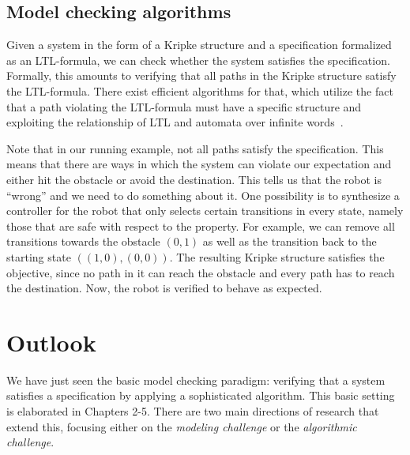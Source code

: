 \documentclass[11pt]{article}
\begin{document}
\subsection{Model checking algorithms}

Given a system in the form of a Kripke structure and a specification formalized as an LTL-formula, we can check whether the system satisfies the specification. 
Formally, this amounts to verifying that all paths in the Kripke structure satisfy the LTL-formula. There exist efficient algorithms for that, which utilize the fact that a path violating the LTL-formula must have a specific structure and exploiting the relationship of LTL and automata over infinite words~\cite[Theorem 2]{handbook}.

Note that in our running example, not all paths satisfy the specification. This means that there are ways in which the system can violate our expectation and either hit the obstacle or avoid the destination.
This tells us that the robot is ``wrong'' and we need to do something about it.
One possibility is to synthesize a controller for the robot that only selects certain transitions in every state, namely those that are safe with respect to the property. For example, we can remove all transitions towards the obstacle $(0,1)$ as well as the transition back to the starting state $((1,0),(0,0))$. 
The resulting Kripke structure satisfies the objective, since no path in it can reach the obstacle and every path has to reach the destination. 
Now, the robot is verified to behave as expected.


\section{Outlook}\label{sec:outlook}

We have just seen the basic model checking paradigm: verifying that a system satisfies a specification by applying a sophisticated algorithm. This basic setting is elaborated in Chapters 2-5.
There are two main directions of research that extend this, focusing either on the \emph{modeling challenge} or the \emph{algorithmic challenge}.
\end{document}

